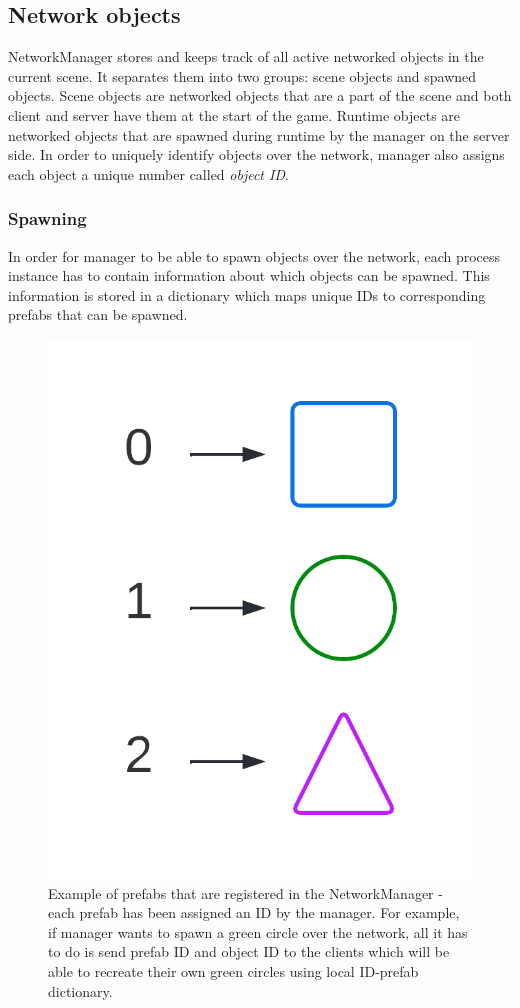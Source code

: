 \documentclass[times, utf8, diplomski]{fer}
\begin{document}
\subsection{Network objects}
NetworkManager stores and keeps track of all active networked objects in the current scene. It separates them into two groups: scene objects and spawned objects. Scene objects are networked objects that are a part of the scene and both client and server have them at the start of the game. Runtime objects are networked objects that are spawned during runtime by the manager on the server side. In order to uniquely identify objects over the network, manager also assigns each object a unique number called \textit{object ID}. \\

\subsubsection{Spawning}
In order for manager to be able to spawn objects over the network, each process instance has to contain information about which objects can be spawned. This information is stored in a dictionary which maps unique IDs to corresponding prefabs that can be spawned.

\begin{figure}[H]
	\centering
	\includegraphics[scale=0.25]{NetworkManager-prefabs}
	\caption{Example of prefabs that are registered in the NetworkManager - each prefab has been assigned an ID by the manager. For example, if manager wants to spawn a green circle over the network, all it has to do is send prefab ID and object ID to the clients which will be able to recreate their own green circles using local ID-prefab dictionary.}
\end{figure}
\end{document}
